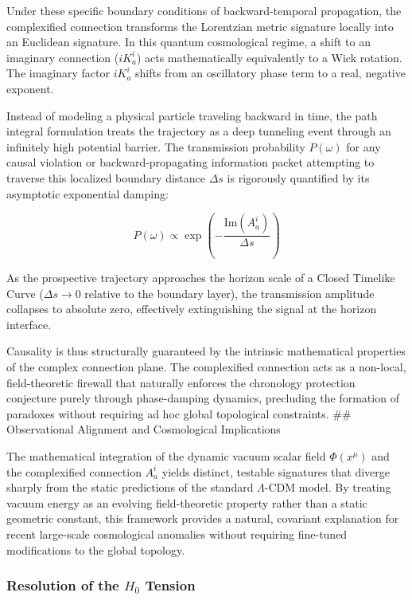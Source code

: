 Under these specific boundary conditions of backward-temporal
propagation, the complexified connection transforms the Lorentzian
metric signature locally into an Euclidean signature. In this quantum
cosmological regime, a shift to an imaginary connection (\(iK_a^i\))
acts mathematically equivalently to a Wick rotation. The imaginary
factor \(i K_a^i\) shifts from an oscillatory phase term to a real,
negative exponent.

Instead of modeling a physical particle traveling backward in time, the
path integral formulation treats the trajectory as a deep tunneling
event through an infinitely high potential barrier. The transmission
probability \(P(\omega)\) for any causal violation or
backward-propagating information packet attempting to traverse this
localized boundary distance \(\Delta s\) is rigorously quantified by its
asymptotic exponential damping:

\[P(\omega) \propto \exp\left(-\frac{\text{Im}(A_a^i)}{\Delta s}\right)\]

As the prospective trajectory approaches the horizon scale of a Closed
Timelike Curve (\(\Delta s \to 0\) relative to the boundary layer), the
transmission amplitude collapses to absolute zero, effectively
extinguishing the signal at the horizon interface.

Causality is thus structurally guaranteed by the intrinsic mathematical
properties of the complex connection plane. The complexified connection
acts as a non-local, field-theoretic firewall that naturally enforces
the chronology protection conjecture purely through phase-damping
dynamics, precluding the formation of paradoxes without requiring ad hoc
global topological constraints. \#\# Observational Alignment and
Cosmological Implications

The mathematical integration of the dynamic vacuum scalar field
\(\Phi(x^\mu)\) and the complexified connection \(A_a^i\) yields
distinct, testable signatures that diverge sharply from the static
predictions of the standard \(\Lambda\)-CDM model. By treating vacuum
energy as an evolving field-theoretic property rather than a static
geometric constant, this framework provides a natural, covariant
explanation for recent large-scale cosmological anomalies without
requiring fine-tuned modifications to the global topology.

\subsubsection{\texorpdfstring{Resolution of the \(H_0\)
Tension}{Resolution of the H\_0 Tension}}\label{resolution-of-the-h_0-tension}

